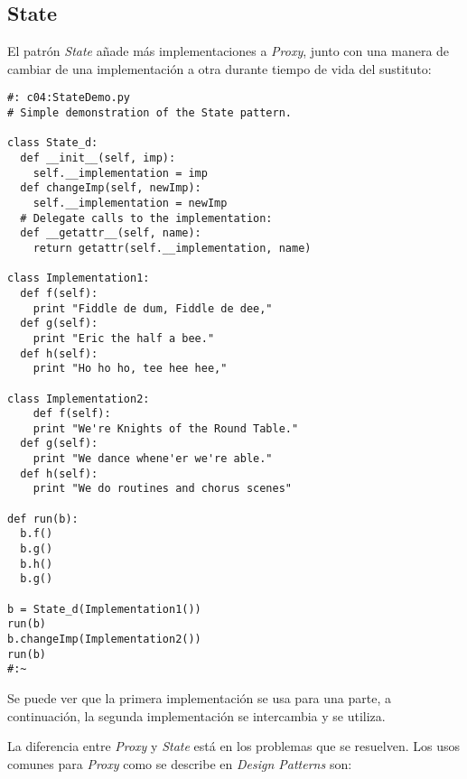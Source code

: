 \newpage


\subsection*{State}
\label{subsec:State}

El patrón \textit{State} añade más implementaciones a \textit{Proxy}, junto con una manera de cambiar de una implementación a otra durante tiempo de vida del sustituto: \newline

\begin{lstlisting} 
#: c04:StateDemo.py 
# Simple demonstration of the State pattern.

class State_d: 
  def __init__(self, imp):  
    self.__implementation = imp  
  def changeImp(self, newImp): 
    self.__implementation = newImp 
  # Delegate calls to the implementation: 
  def __getattr__(self, name): 
    return getattr(self.__implementation, name) 
    
class Implementation1: 
  def f(self):  
    print "Fiddle de dum, Fiddle de dee,"  
  def g(self):  
    print "Eric the half a bee."  
  def h(self):  
    print "Ho ho ho, tee hee hee,"  
    
class Implementation2: 
    def f(self):  
    print "We're Knights of the Round Table."  
  def g(self):  
    print "We dance whene'er we're able."  
  def h(self):  
    print "We do routines and chorus scenes"  
    
def run(b): 
  b.f() 
  b.g() 
  b.h() 
  b.g() 
  
b = State_d(Implementation1()) 
run(b) 
b.changeImp(Implementation2()) 
run(b) 
#:~ 
\end{lstlisting}

Se puede ver que la primera implementación se usa para una parte, a continuación, la segunda implementación se intercambia y se utiliza.     \newline

La diferencia entre \textit{Proxy} y \textit{State} está en los problemas que se resuelven. Los usos comunes para \textit{Proxy} como se describe en \textit{Design Patterns} son:

